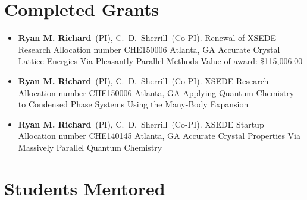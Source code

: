 \documentclass[11pt,a4paper,sans]{moderncv}
\begin{document}
\section{Completed Grants}
\vspace{5pt}
\begin{itemize}
	\item{
          {\textbf{Ryan M. Richard}\ (PI), C.~D.~Sherrill\ (Co-PI).}
          {Renewal of XSEDE Research Allocation number CHE150006}
          {Atlanta, GA}
          {}
          {Accurate Crystal Lattice Energies Via Pleasantly Parallel Methods}
          {Value of award: \$115,006.00}
          {}}
	\item{
          {\textbf{Ryan M. Richard}\ (PI), C.~D.~Sherrill\ (Co-PI).}
          {XSEDE Research Allocation number CHE150006}
          {Atlanta, GA}
          {}
          {Applying Quantum Chemistry to Condensed Phase Systems Using the Many-Body Expansion}
          {}
          {}}
	\item{
          {\textbf{Ryan M. Richard}\ (PI), C.~D.~Sherrill\ (Co-PI).}
          {XSEDE Startup Allocation number CHE140145}
          {Atlanta, GA}
          {}
          {Accurate Crystal Properties Via Massively Parallel Quantum Chemistry}
          {}
          {}}
\end{itemize}

\section{Students Mentored}
\end{document}

